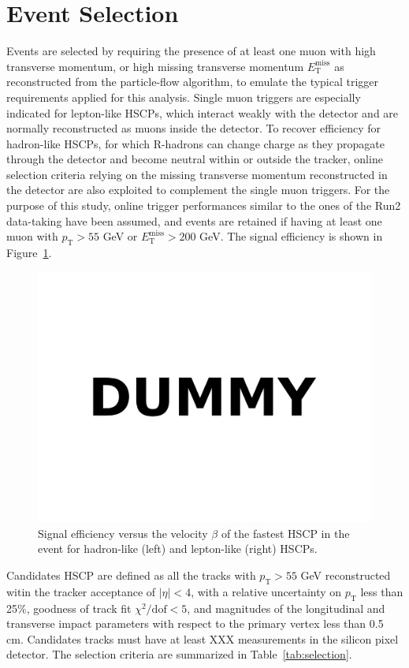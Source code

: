 \documentclass[11pt,oneside,a4paper]{article}
\begin{document}
\section{Event Selection}

Events are selected by requiring the presence of at least one muon with high transverse momentum, or high missing transverse momentum $E_{\mathrm{T}}^{\mathrm{miss}}$ as reconstructed from the particle-flow algorithm, to emulate the typical trigger requirements applied for this analysis.
Single muon triggers are especially indicated for lepton-like HSCPs, which interact weakly with the detector and are normally reconstructed as muons inside the detector.
To recover efficiency for hadron-like HSCPs, for which R-hadrons can change charge as they propagate through the detector and become neutral within or outside the tracker, online selection criteria relying on the missing transverse momentum reconstructed in the detector are also exploited to complement the single muon triggers.
For the purpose of this study, online trigger performances similar to the ones of the Run2 data-taking have been assumed, and events are retained if having at least one muon with $p_{\mathrm{T}} > 55$ GeV or $E_{\mathrm{T}}^{\mathrm{miss}} > 200$ GeV.
The signal efficiency is shown in Figure~\ref{fig:effbeta}.

\begin{figure}
\centering
\includegraphics[width=.5\textwidth]{figures/dummy.pdf}
\caption{Signal efficiency versus the velocity $\beta$ of the fastest HSCP in the event for hadron-like (left) and lepton-like (right) HSCPs.\label{fig:effbeta}}
\end{figure}


Candidates HSCP are defined as all the tracks with $p_{\mathrm{T}} > 55$ GeV reconstructed witin the tracker acceptance of $|\eta| < 4$, with a relative uncertainty on $p_{\mathrm{T}}$ less than 25\%, goodness of track fit $\chi^2/\mathrm{dof} < 5$, and magnitudes of the longitudinal and transverse impact parameters with respect to the primary vertex less than 0.5 cm. 
Candidates tracks must have at least XXX measurements in the silicon pixel detector.
The selection criteria are summarized in Table~\ref{tab:selection}.
\end{document}
